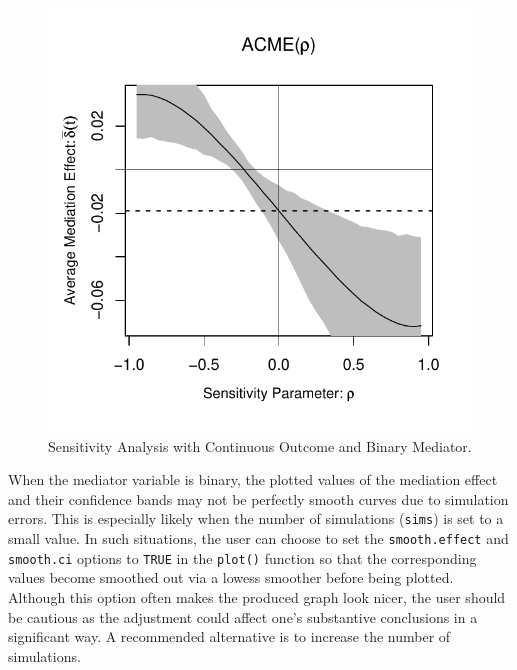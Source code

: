 \documentclass[11pt,letterpaper]{article}
\theoremstyle{plain}
\begin{document}
\begin{figure}[t]
\vspace{-.5in}
\begin{center}
\includegraphics[scale=.8]{BinaryMediator-Sensitivity-Rpaper.pdf}
\end{center}
\vspace{-.5in}
\caption{Sensitivity Analysis with Continuous Outcome and Binary Mediator.
  \label{SensBinMed}}
\end{figure}

When the mediator variable is binary, the plotted values of the mediation effect
and their confidence bands may not be perfectly smooth curves due to simulation errors.
This is especially likely when the number of simulations (\texttt{sims}) is set 
to a small value.  In such situations, the user can choose to set the 
\texttt{smooth.effect} and \texttt{smooth.ci} options to \texttt{TRUE} in the
\texttt{plot()} function so that the corresponding values become smoothed 
out via a lowess smoother before being plotted.  Although this option 
often makes the produced graph look nicer, the user should be cautious as 
the adjustment could affect one's substantive conclusions in a 
significant way.  A recommended alternative is to increase the number of 
simulations.
\end{document}
